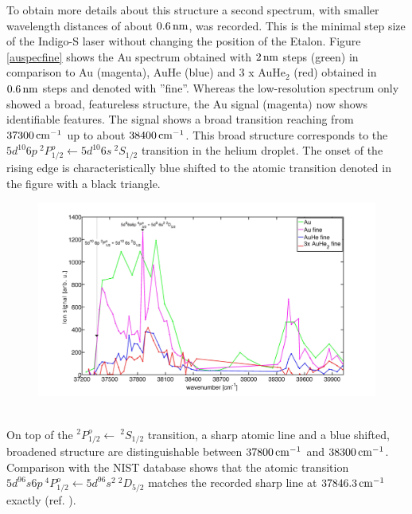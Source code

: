 \documentclass[parskip,12pt,headsepline,a4paper] {scrbook}
\begin{document}
\newpage

To obtain more details about this structure a second spectrum, with smaller wavelength distances of about $\unit[0.6]{nm}$, was recorded. This is the minimal step size of the Indigo-S laser without changing the position of the Etalon. Figure \ref{auspecfine} shows the Au spectrum obtained with $\unit[2]{nm}$ steps (green) in comparison to Au (magenta), AuHe (blue) and 3 x AuHe$_2$ (red) obtained in $\unit[0.6]{nm}$ steps and denoted with ''fine''. Whereas the low-resolution spectrum only showed a broad, featureless structure, the Au signal (magenta) now shows identifiable features. The signal shows a broad transition reaching from $\unit[37300]{cm^{-1}}$ up to about $\unit[38400]{cm^{-1}}$. This broad structure corresponds to the $5d^{10}6p \ ^2P^o_{1/2} \leftarrow 5d^{10}6s \ ^2S_{1/2}$ transition in the helium droplet. The onset of the rising edge is characteristically blue shifted to the atomic transition denoted in the figure with a black triangle.
\begin{figure}[ht]
\centerline{
\includegraphics[width=17cm]{./results/au_specFine_new.jpg}}
\end{figure}\\
On top of the $^2P^o_{1/2} \leftarrow \ ^2S_{1/2}$ transition, a sharp atomic line and a blue shifted, broadened structure are distinguishable between $\unit[37800]{cm^{-1}}$ and $\unit[38300]{cm^{-1}}$. Comparison with the NIST database shows that the atomic transition $5d^96s6p \ ^4P^o_{1/2} \leftarrow 5d^96s^2 \ ^2D_{5/2}$ matches the recorded sharp line at $\unit[37 846.3]{cm^{-1}}$ exactly (ref. \cite{nist}). %
\end{document}
